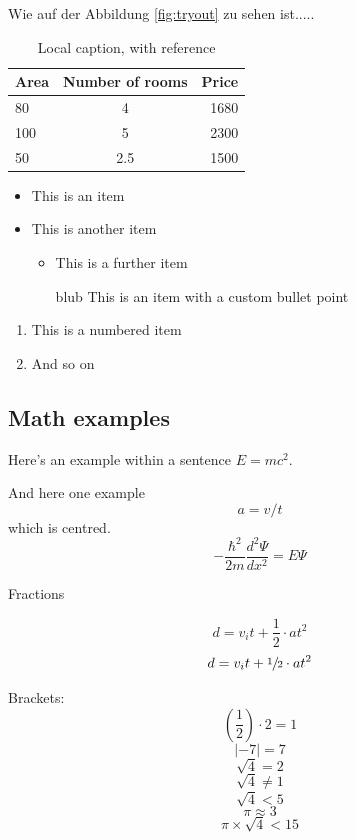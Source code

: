 \documentclass{article}
\begin{document}
Wie auf der Abbildung \ref{fig:tryout} zu sehen ist.....


\begin{table}[H]
	\centering
	\label{tab:tryouttab}
\caption[This is an optional caption, without reference]{Local caption, with reference}
	\cite{ref:ds_1, ref:nn_1, ref:ai_1}	%

	\begin{tabular}{l c r}
		Area & Number of rooms & Price \\ \hline
		80	& 4				& 1680 \\
		100	& 5				& 2300 \\
		50	& 2.5				& 1500 \\
		
	\end{tabular}
\end{table}


\begin{itemize}
	\item This is an item
	\item This is another item
	\begin{itemize}
		\item This is a further item
		\item [blub] This is an item with a custom bullet point
	\end{itemize}
\end{itemize}

\begin{enumerate}
	\item This is a numbered item
	\item And so on
\end{enumerate}


\newpage
\subsection{Math examples}

Here's an example within a sentence $E =mc^2$.

And here one example $$a=v/t$$ which is centred. \\

$$-\frac{\hbar^2}{2m}\frac{d^2\Psi}{dx^2} = E\Psi$$

Fractions

$$d = v_it + \frac{1}{2} \cdot at^2$$
$$d = v_it + \sfrac{1}{2} \cdot at^2$$


Brackets:
$$\left( \frac{1}{2} \right) \cdot 2 = 1$$	%
$$\left| -7 \right| = 7$$
$$\sqrt{4} = 2$$
$$\sqrt{4} \ne 1$$
$$\sqrt{4} < 5$$
$$ \pi \approx 3 $$
$$ \pi \times \sqrt{4} < 15 $$
\end{document}
